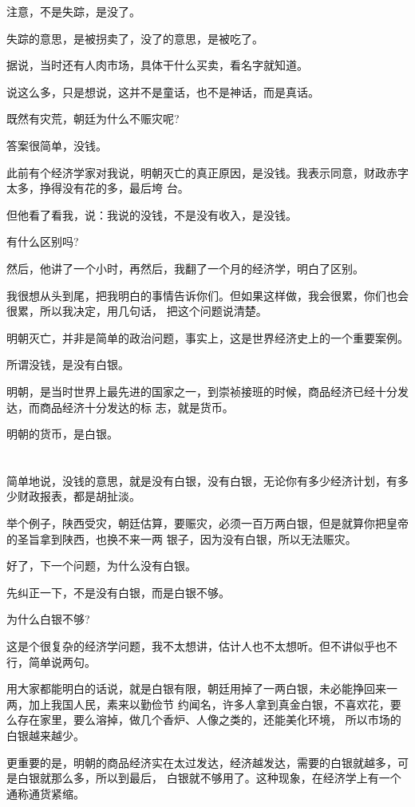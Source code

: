 \documentclass[11pt,a4paper,onecolumn]{article}
\begin{document}
注意，不是失踪，是没了。

失踪的意思，是被拐卖了，没了的意思，是被吃了。

据说，当时还有人肉市场，具体干什么买卖，看名字就知道。

说这么多，只是想说，这并不是童话，也不是神话，而是真话。

既然有灾荒，朝廷为什么不赈灾呢?

答案很简单，没钱。

此前有个经济学家对我说，明朝灭亡的真正原因，是没钱。我表示同意，财政赤字太多，挣得没有花的多，最后垮
台。

但他看了看我，说：我说的没钱，不是没有收入，是没钱。

有什么区别吗?

然后，他讲了一个小时，再然后，我翻了一个月的经济学，明白了区别。

我很想从头到尾，把我明白的事情告诉你们。但如果这样做，我会很累，你们也会很累，所以我决定，用几句话，
把这个问题说清楚。

明朝灭亡，并非是简单的政治问题，事实上，这是世界经济史上的一个重要案例。

所谓没钱，是没有白银。

明朝，是当时世界上最先进的国家之一，到崇祯接班的时候，商品经济已经十分发达，而商品经济十分发达的标
志，就是货币。

明朝的货币，是白银。

\section[\thesection]{}

简单地说，没钱的意思，就是没有白银，没有白银，无论你有多少经济计划，有多少财政报表，都是胡扯淡。

举个例子，陕西受灾，朝廷估算，要赈灾，必须一百万两白银，但是就算你把皇帝的圣旨拿到陕西，也换不来一两
银子，因为没有白银，所以无法赈灾。

好了，下一个问题，为什么没有白银。

先纠正一下，不是没有白银，而是白银不够。

为什么白银不够?

这是个很复杂的经济学问题，我不太想讲，估计人也不太想听。但不讲似乎也不行，简单说两句。

用大家都能明白的话说，就是白银有限，朝廷用掉了一两白银，未必能挣回来一两，加上我国人民，素来以勤俭节
约闻名，许多人拿到真金白银，不喜欢花，要么存在家里，要么溶掉，做几个香炉、人像之类的，还能美化环境，
所以市场的白银越来越少。

更重要的是，明朝的商品经济实在太过发达，经济越发达，需要的白银就越多，可是白银就那么多，所以到最后，
白银就不够用了。这种现象，在经济学上有一个通称\myrule 通货紧缩。
\end{document}
